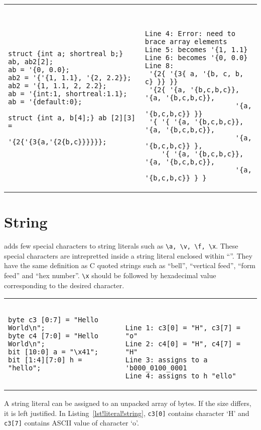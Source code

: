 \begin{table}
\begin{tabular}{p{} p{}}
\begin{lstlisting}[label=lst!literal!struct, caption=Structure Literals]
struct {int a; shortreal b;} ab, ab2[2];
ab = '{0, 0.0};
ab2 = '{'{1, 1.1}, '{2, 2.2}};
ab2 = '{1, 1.1, 2, 2.2};
ab = '{int:1, shortreal:1.1};
ab = '{default:0};

struct {int a, b[4];} ab [2][3] =
                '{2{'{3{a,'{2{b,c}}}}}};
\end{lstlisting}
&
\begin{tbldesc}
\begin{verbatim}


Line 4: Error: need to brace array elements
Line 5: becomes '{1, 1.1}
Line 6: becomes '{0, 0.0}
Line 8:
 '{2{ '{3{ a, '{b, c, b, c} }} }}
 '{2{ '{a, '{b,c,b,c}}, '{a, '{b,c,b,c}},
                      '{a, '{b,c,b,c}} }}
 '{ '{ '{a, '{b,c,b,c}}, '{a, '{b,c,b,c}},
                      '{a, '{b,c,b,c}} },
    '{ '{a, '{b,c,b,c}}, '{a, '{b,c,b,c}},
                      '{a, '{b,c,b,c}} } }
\end{verbatim}
\end{tbldesc}
\end{tabular}
\end{table}

\section{String}
\lsvlog adds few special characters to string literals such as
\texttt{\textbackslash{}a, \textbackslash{}v, \textbackslash{}f,
  \textbackslash{}x}. These special characters are intrepretted inside
a string literal enclosed within ``''. They have the same definition
as C quoted strings such as ``bell'', ``vertical feed'', ``form feed''
and ``hex number''. \texttt{\textbackslash{}x} should be followed by
hexadecimal value corresponding to the desired character.

\begin{table}
\begin{tabular}{p{} p{}}
\begin{lstlisting}[label=lst!literal!string, caption=String Literal
    Examples]
byte c3 [0:7] = "Hello World\n";
byte c4 [7:0] = "Hello World\n";
bit [10:0] a = "\x41";
bit [1:4][7:0] h = "hello";
\end{lstlisting}
&
\begin{tbldesc}
\begin{verbatim}


Line 1: c3[0] = "H", c3[7] = "o"
Line 2: c4[0] = "H", c4[7] = "H"
Line 3: assigns to a 'b000_0100_0001
Line 4: assigns to h "ello"
\end{verbatim}
\end{tbldesc}
\end{tabular}
\end{table}

A string literal can be assigned to an unpacked array of bytes. If the
size differs, it is left justified. In
Listing~\ref{lst!literal!string}, \texttt{c3[0]} contains character
`H' and \texttt{c3[7]} contains ASCII value of character `o'.
